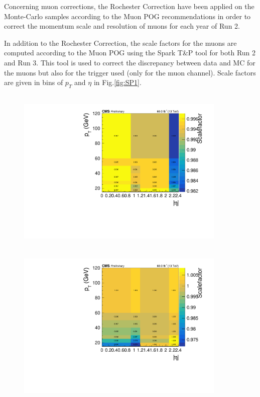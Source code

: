 \documentclass{cernatlasnote}
\begin{document}
Concerning muon corrections, the Rochester Correction \cite{ROCCOR} have been applied on the Monte-Carlo samples according to the Muon POG recommendations in order to correct the momentum scale and resolution of muons for each year of Run 2.

    In addition to the Rochester Correction, the scale factors for the muons are computed according to the Muon POG \cite{MuonSpark1}\cite{MuonSpark2} using the Spark T\&P tool for both Run 2 and Run 3. This tool is used to correct the discrepancy between data and MC for the muons but also for the trigger used (only for the muon channel). Scale factors are given in bins of $p_T$ and $\eta$ in Fig.\ref{fig:SP1}.
    \label{Spark}

\begin{figure}
    \centering
    \includegraphics[height=8cm, width=10cm, trim= 0cm 0cm 0cm 0.cm,clip]{images/Spark/NUM_probe_isTight_DEN_TrackerMuons_abseta_pt.pdf}
    \includegraphics[height=8cm, width=10cm, trim= 0cm 0cm 0cm 0.cm,clip]{images/Spark/NUM_probe_MiniIsoTight_DEN_probe_isTight_abseta_pt.pdf}

\end{figure}
\end{document}
